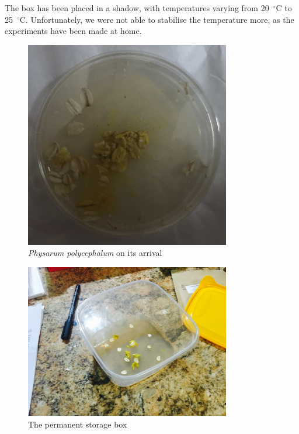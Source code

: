 \documentclass[english,a4paper,twoside]{ppfcmthesis}
\begin{document}
The box has been placed in a shadow, with temperatures varying from 20~$^{\circ}$C to 25~$^{\circ}$C. Unfortunately, we were not able to stabilise the temperature more, as the experiments have been made at home.

\begin{figure}
  \centering

  \includegraphics[width=0.8\textwidth]{figures/physarum/IMG_1168_crop.jpg}

  \caption{\textit{Physarum polycephalum} on its arrival}
  \label{figure:p_initial_petri}
\end{figure}

\begin{figure}
  \centering

  \includegraphics[width=0.8\textwidth]{figures/physarum/IMG_1179.jpg}

  \caption{The permanent storage box}
  \label{figure:p_box}
\end{figure}
\end{document}

